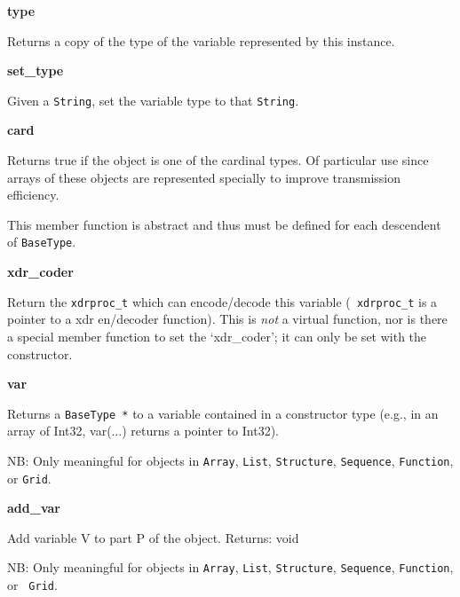 \begin{description}
\item {\bf type}


Returns a copy of the type of the variable represented by this instance.

\item {\bf set\_type}


Given a {\tt String}, set the variable type to that {\tt String}.

\item {\bf card}


Returns true if the object is one of the cardinal types. Of particular use
since arrays of these objects are represented specially to improve
transmission efficiency.

This member function is abstract and thus must be defined for each descendent
of {\tt BaseType}.

\item {\bf xdr\_coder}


Return the {\tt xdrproc\_t} which can encode/decode this variable ({\tt
xdrproc\_t} is a pointer to a xdr en/decoder function). This is {\em not\/} a
virtual function, nor is there a special member function to set the
`xdr\_coder'; it can only be set with the constructor.

\item {\bf var}


Returns a {\tt BaseType *} to a variable contained in a constructor type
(e.g., in an array of Int32, var(...) returns a pointer to Int32).  

NB: Only meaningful for objects in {\tt Array}, {\tt List}, {\tt Structure},
{\tt Sequence}, {\tt Function}, or {\tt Grid}.

\item {\bf add\_var}


Add variable V to part P of the object.     Returns: void

NB: Only meaningful for objects in {\tt Array}, {\tt List},
{\tt    Structure}, {\tt Sequence}, {\tt Function}, or {\tt
Grid}.


\end{description}
